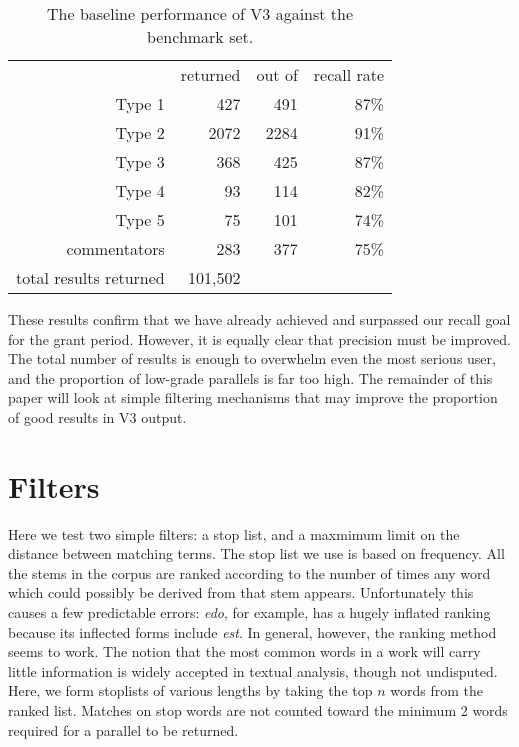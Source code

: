 \documentclass[11pt]{article}
\begin{document}
	\begin{table}
		
		\centering
		
		\caption{\label{baseline} The baseline performance of V3 against the benchmark set.}
		
		\vspace{1em}
		
		\begin{tabular}{rrrr}
			 	
							 &		returned	& out of & recall rate		\\
			Type 1		 &		427		&	491	& 87\%				\\
			Type 2		 &		2072		&	2284	& 91\%				\\
			Type 3		 &		368		&	425	& 87\%				\\
			Type 4		 &		93			&	114	& 82\%				\\
			Type 5		 &		75			&	101	& 74\%				\\
			commentators &		283		&	377	& 75\%				\\
			\hline
			total results returned	&	101,502 &  &					\\
		\end{tabular}
		
	\end{table}
	
	These results confirm that we have already achieved and surpassed our recall goal for the grant period.  However, it is equally clear that precision must be improved.  The total number of results is enough to overwhelm even the most serious user, and the proportion of low-grade parallels is far too high.  The remainder of this paper will look at simple filtering mechanisms that may improve the proportion of good results in V3 output.
	
	\section{Filters}
	
	Here we test two simple filters: a stop list, and a maxmimum limit on the distance between matching terms.  The stop list we use is based on frequency.  All the stems in the corpus are ranked according to the number of times any word which could possibly be derived from that stem appears.  Unfortunately this causes a few predictable errors: \emph{edo}, for example, has a hugely inflated ranking because its inflected forms include \emph{est}.  In general, however, the ranking method seems to work.  The notion that the most common words in a work will carry little information is widely accepted in textual analysis, though not undisputed.  Here, we form stoplists of various lengths by taking the top $n$ words from the ranked list.  Matches on stop words are not counted toward the minimum 2 words required for a parallel to be returned.
	
\end{document}

